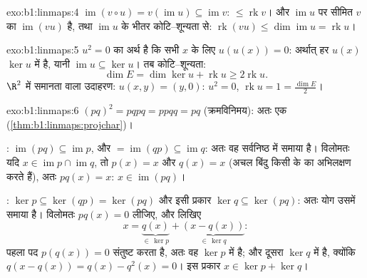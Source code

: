 \begin{solution}{exo:b1:linmaps:4}
$\operatorname{im}(v \circ u) = v(\operatorname{im} u) \subseteq
\operatorname{im} v$:  $\leq \operatorname{rk} v$। और $\operatorname{im}
u$ पर सीमित $v$ का  $\operatorname{im}(vu)$ है, तथा
$\operatorname{im} u$ के भीतर कोटि--शून्यता से: $\operatorname{rk}(vu) \leq
\dim\operatorname{im} u = \operatorname{rk} u$।
\end{solution}

\begin{solution}{exo:b1:linmaps:5}
$u^2 = 0$ का अर्थ है कि सभी $x$ के लिए $u(u(x)) = 0$: अर्थात् हर $u(x)$
$\ker u$ में है, यानी $\operatorname{im} u \subseteq \ker u$। तब
कोटि--शून्यता:
\[
\dim E = \dim\ker u + \operatorname{rk} u \geq 2\operatorname{rk} u .
\]
$\R^2$ में समानता वाला उदाहरण: $u(x, y) = (y, 0)$: $u^2 = 0$,
$\operatorname{rk} u = 1 = \frac{\dim E}{2}$।
\end{solution}

\begin{solution}{exo:b1:linmaps:6}
$(pq)^2 = pqpq = ppqq = pq$ (क्रमविनिमय): अतः एक 
(\cref{thm:b1:linmaps:projchar})।

: $\operatorname{im}(pq) \subseteq \operatorname{im} p$, और $=
\operatorname{im}(qp) \subseteq \operatorname{im} q$: अतः वह सर्वनिष्ठ में
समाया है। विलोमतः यदि $x \in \operatorname{im} p \cap \operatorname{im} q$,
तो $p(x) = x$ और $q(x) = x$ (अचल बिंदु किसी  के  का
अभिलक्षण करते हैं), अतः $pq(x) = x$: $x \in \operatorname{im}(pq)$।

: $\ker p \subseteq \ker(qp) = \ker(pq)$ और इसी प्रकार $\ker q
\subseteq \ker(pq)$: अतः योग उसमें समाया है। विलोमतः $pq(x) = 0$ लीजिए, और
लिखिए
\[
x = \underbrace{q(x)}_{\in\, \ker p} +
\underbrace{(x - q(x))}_{\in\, \ker q} :
\]
पहला पद $p(q(x)) = 0$ संतुष्ट करता है, अतः वह $\ker p$ में है; और दूसरा
$\ker q$ में है, क्योंकि $q(x - q(x)) = q(x) - q^2(x) = 0$। इस प्रकार $x \in
\ker p + \ker q$।
\end{solution}

